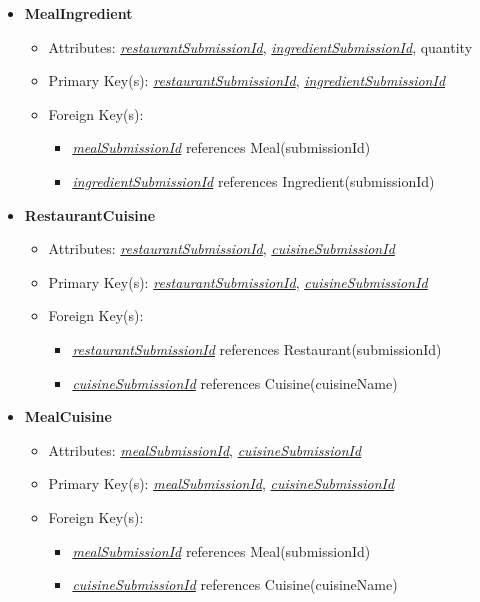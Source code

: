 \begin{itemize}
        \item \textbf{MealIngredient}
        \begin{itemize}
            \item Attributes: \underline{\textit{restaurantSubmissionId}}, \underline{\textit{ingredientSubmissionId}}, quantity
            \item Primary Key(s): \underline{\textit{restaurantSubmissionId}}, \underline{\textit{ingredientSubmissionId}}
            \item Foreign Key(s): 
                \begin{itemize}
                    \item \underline{\textit{mealSubmissionId}} references Meal(submissionId)
                    \item \underline{\textit{ingredientSubmissionId}} references Ingredient(submissionId)
                \end{itemize}   
        \end{itemize}

        \item \textbf{RestaurantCuisine}
        \begin{itemize}
            \item Attributes: \underline{\textit{restaurantSubmissionId}}, \underline{\textit{cuisineSubmissionId}}
            \item Primary Key(s): \underline{\textit{restaurantSubmissionId}}, \underline{\textit{cuisineSubmissionId}}
            \item Foreign Key(s): 
                \begin{itemize}
                    \item \underline{\textit{restaurantSubmissionId}} references Restaurant(submissionId)
                    \item \underline{\textit{cuisineSubmissionId}} references Cuisine(cuisineName)
                \end{itemize}   
        \end{itemize}

        \item \textbf{MealCuisine}
        \begin{itemize}
            \item Attributes: \underline{\textit{mealSubmissionId}}, \underline{\textit{cuisineSubmissionId}}
            \item Primary Key(s): \underline{\textit{mealSubmissionId}}, \underline{\textit{cuisineSubmissionId}}
            \item Foreign Key(s): 
                \begin{itemize}
                    \item \underline{\textit{mealSubmissionId}} references Meal(submissionId)
                    \item \underline{\textit{cuisineSubmissionId}} references Cuisine(cuisineName)
                \end{itemize}   
        \end{itemize}
    \end{itemize}